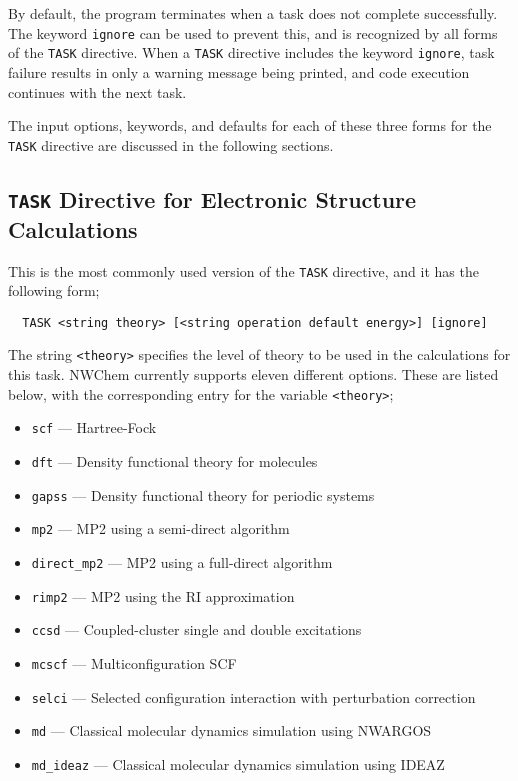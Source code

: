 By default, the program terminates when a task does not complete
successfully.  The keyword \verb+ignore+ can be used to prevent this,
and is recognized by all forms of the \verb+TASK+ directive.  When a
\verb+TASK+ directive includes the keyword \verb+ignore+, task failure
results in only a warning message being printed, and code execution
continues with the next task.

The input options, keywords, and defaults for each of
these three forms for the \verb+TASK+ directive are discussed in the
following sections.

\subsection{{\tt TASK} Directive for Electronic Structure Calculations}

This is the most commonly used version of the \verb+TASK+ directive, and
it has the following form;

\begin{verbatim}
  TASK <string theory> [<string operation default energy>] [ignore]
\end{verbatim}

The string \verb+<theory>+ specifies the level of theory to be used in the
calculations for this task.  NWChem currently supports eleven different
options.  These are listed below, with the corresponding entry for 
the variable {\tt <theory>};
\begin{itemize}
 \item \verb+scf+ --- Hartree-Fock
 \item \verb+dft+ --- Density functional theory for molecules
 \item \verb+gapss+ --- Density functional theory for periodic systems
 \item \verb+mp2+ --- MP2 using a semi-direct algorithm
 \item \verb+direct_mp2+ --- MP2 using a full-direct algorithm
 \item \verb+rimp2+ --- MP2 using the RI approximation
 \item \verb+ccsd+ --- Coupled-cluster single and double excitations
 \item \verb+mcscf+ --- Multiconfiguration SCF
 \item \verb+selci+ --- Selected configuration interaction with perturbation
   correction 
 \item \verb+md+ --- Classical molecular dynamics simulation using NWARGOS
 \item \verb+md_ideaz+ --- Classical molecular dynamics simulation
   using IDEAZ
\end{itemize}

